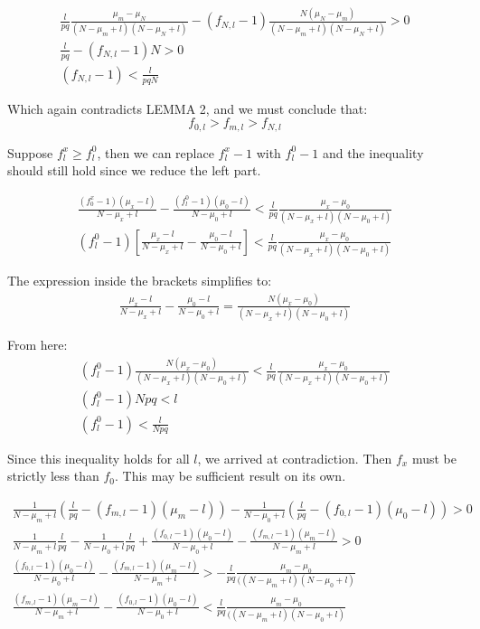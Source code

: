\documentclass[11pt,draft]{article}
\begin{document}
\begin{align}
\frac{l}{pq} \frac{\mu_m - \mu_N}{(N-\mu_m + l)(N-\mu_N + l)}  - (f_{N,l} - 1) \frac{N(\mu_N-\mu_m)}{(N-\mu_m + l)(N-\mu_N + l)} > 0 \\
\frac{l}{pq} - (f_{N,l} - 1)N > 0 \\
(f_{N,l} - 1) < \frac{l}{pqN}
\end{align}

Which again contradicts LEMMA 2, and we must conclude that:
\[ f_{0,l} > f_{m,l} > f_{N,l} \]

\clearpage








Suppose $f^x_l \ge f^0_l$, then we can replace $f^x_l - 1$ with $f^0_l - 1$ and the inequality should still hold since we reduce the left part.

\begin{align}
\frac{(f^x_0 - 1)(\mu_x - l)}{N-\mu_x + l}  - \frac{(f^0_l - 1)(\mu_0 - l)}{N-\mu_0 + l} < \frac{l}{pq} \frac{\mu_x - \mu_0}{(N-\mu_x + l)(N-\mu_0 + l)} \\
(f^0_l - 1) \left [ \frac{\mu_x - l}{N-\mu_x + l}  - \frac{\mu_0 - l}{N-\mu_0 + l} \right ] < \frac{l}{pq} \frac{\mu_x - \mu_0}{(N-\mu_x + l)(N-\mu_0 + l)}
\end{align}

The expression inside the brackets simplifies to:
\begin{align}
\frac{\mu_x - l}{N-\mu_x + l}  - \frac{\mu_0 - l}{N-\mu_0 + l} = \frac{N(\mu_x-\mu_0)}{(N-\mu_x + l)(N-\mu_0 + l)}
\end{align}

From here:
\begin{align}
(f^0_l - 1) \frac{N(\mu_x-\mu_0)}{(N-\mu_x + l)(N-\mu_0 + l)} < \frac{l}{pq} \frac{\mu_x - \mu_0}{(N-\mu_x + l)(N-\mu_0 + l)} \\
(f^0_l - 1)Npq < l \\
(f^0_l - 1) < \frac{l}{Npq}
\end{align}


Since this inequality holds for all $l$, we arrived at contradiction.   Then $f_x$ must be strictly less than $f_0$.   
This may be  sufficient result on its own.
 
\begin{align}
\frac{1}{N-\mu_m + l}(\frac{l}{pq} - (f_{m,l} - 1)(\mu_m - l)) -  \frac{1}{N-\mu_0 + l}(\frac{l}{pq} - (f_{0,l} - 1)(\mu_0 - l))  > 0\\
  \frac{1}{N-\mu_m + l}\frac{l}{pq}  - \frac{1}{N-\mu_0 + l} \frac{l}{pq}  + \frac{(f_{0,l} - 1)(\mu_0 - l)}{N-\mu_0 + l} - \frac{(f_{m,l} - 1)(\mu_m - l)}{N-\mu_m + l} > 0 \\
\frac{(f_{0,l} - 1)(\mu_0 - l)}{N-\mu_0 + l} - \frac{(f_{m,l} - 1)(\mu_m - l)}{N-\mu_m + l} > - \frac{l}{pq} \frac{\mu_m - \mu_0}{((N-\mu_m + l)(N-\mu_0 + l)} \\
\frac{(f_{m,l} - 1)(\mu_m - l)}{N-\mu_m + l}  - \frac{(f_{0,l} - 1)(\mu_0 - l)}{N-\mu_0 + l} < \frac{l}{pq} \frac{\mu_m - \mu_0}{((N-\mu_m + l)(N-\mu_0 + l)}
\end{align}
\end{document}
